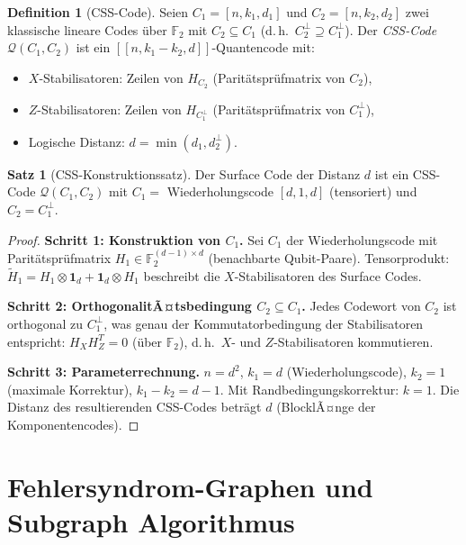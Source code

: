 ﻿\documentclass[a4paper,12pt]{article}
\theoremstyle{definition}
\newtheorem{definition}{Definition}
\newtheorem{satz}{Satz}
\begin{document}
\begin{definition}[CSS-Code]
\label{def:css}
Seien $C_1 = [n, k_1, d_1]$ und $C_2 = [n, k_2, d_2]$ zwei klassische
lineare Codes \"uber $\mathbb{F}_2$ mit $C_2 \subseteq C_1$ (d.\,h.\
$C_2^\perp \supseteq C_1^\perp$). Der \emph{CSS-Code}
$\mathcal{Q}(C_1, C_2)$ ist ein $[[n, k_1 - k_2, d]]$-Quantencode mit:
\begin{itemize}
    \item $X$-Stabilisatoren: Zeilen von $H_{C_2}$ (Parit\"atspr\"ufmatrix von $C_2$),
    \item $Z$-Stabilisatoren: Zeilen von $H_{C_1^\perp}$ (Parit\"atspr\"ufmatrix von $C_1^\perp$),
    \item Logische Distanz: $d = \min(d_1, d_2^\perp)$.
\end{itemize}
\end{definition}

\begin{satz}[CSS-Konstruktionssatz]
\label{satz:css}
Der Surface Code der Distanz $d$ ist ein CSS-Code
$\mathcal{Q}(C_1, C_2)$ mit $C_1 = $ Wiederholungscode $[d, 1, d]$
(tensoriert) und $C_2 = C_1^\perp$.
\end{satz}

\begin{proof}
\textbf{Schritt 1: Konstruktion von $C_1$.}
Sei $C_1$ der Wiederholungscode mit Parit\"atspr\"ufmatrix
$H_1 \in \mathbb{F}_2^{(d-1) \times d}$ (benachbarte Qubit-Paare).
Tensorprodukt: $\tilde{H}_1 = H_1 \otimes \mathbf{1}_d + \mathbf{1}_d \otimes H_1$
beschreibt die $X$-Stabilisatoren des Surface Codes.

\textbf{Schritt 2: OrthogonalitÃ¤tsbedingung $C_2 \subseteq C_1$.}
Jedes Codewort von $C_2$ ist orthogonal zu $C_1^\perp$, was genau der
Kommutatorbedingung der Stabilisatoren entspricht:
$H_X H_Z^T = 0$ (\"uber $\mathbb{F}_2$), d.\,h.\ $X$- und $Z$-Stabilisatoren
kommutieren.

\textbf{Schritt 3: Parameterrechnung.}
$n = d^2$, $k_1 = d$ (Wiederholungscode), $k_2 = 1$ (maximale Korrektur),
$k_1 - k_2 = d - 1$. Mit Randbedingungskorrektur: $k = 1$. Die Distanz
des resultierenden CSS-Codes betr\"agt $d$ (BlocklÃ¤nge der Komponentencodes).
\end{proof}

\section{Fehlersyndrom-Graphen und Subgraph Algorithmus}
\end{document}
